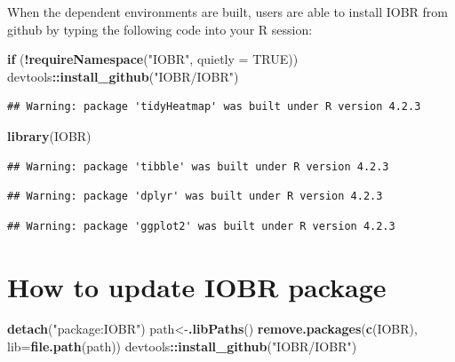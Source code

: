 \documentclass[
  12pt,
]{book}
\newenvironment{Shaded}{\begin{snugshade}}{\end{snugshade}}
\newcommand{\AttributeTok}[1]{\textcolor[rgb]{0.13,0.29,0.53}{#1}}
\newcommand{\ConstantTok}[1]{\textcolor[rgb]{0.56,0.35,0.01}{#1}}
\newcommand{\ControlFlowTok}[1]{\textcolor[rgb]{0.13,0.29,0.53}{\textbf{#1}}}
\newcommand{\FunctionTok}[1]{\textcolor[rgb]{0.13,0.29,0.53}{\textbf{#1}}}
\newcommand{\NormalTok}[1]{#1}
\newcommand{\OtherTok}[1]{\textcolor[rgb]{0.56,0.35,0.01}{#1}}
\newcommand{\SpecialCharTok}[1]{\textcolor[rgb]{0.81,0.36,0.00}{\textbf{#1}}}
\newcommand{\StringTok}[1]{\textcolor[rgb]{0.31,0.60,0.02}{#1}}
\begin{document}
When the dependent environments are built, users are able to install IOBR from github by typing the following code into your R session:

\begin{Shaded}
\begin{Highlighting}[]
\ControlFlowTok{if}\NormalTok{ (}\SpecialCharTok{!}\FunctionTok{requireNamespace}\NormalTok{(}\StringTok{"IOBR"}\NormalTok{, }\AttributeTok{quietly =} \ConstantTok{TRUE}\NormalTok{))  devtools}\SpecialCharTok{::}\FunctionTok{install\_github}\NormalTok{(}\StringTok{"IOBR/IOBR"}\NormalTok{)}
\end{Highlighting}
\end{Shaded}

\begin{verbatim}
## Warning: package 'tidyHeatmap' was built under R version 4.2.3
\end{verbatim}

\begin{Shaded}
\begin{Highlighting}[]
\FunctionTok{library}\NormalTok{(IOBR)}
\end{Highlighting}
\end{Shaded}

\begin{verbatim}
## Warning: package 'tibble' was built under R version 4.2.3
\end{verbatim}

\begin{verbatim}
## Warning: package 'dplyr' was built under R version 4.2.3
\end{verbatim}

\begin{verbatim}
## Warning: package 'ggplot2' was built under R version 4.2.3
\end{verbatim}

\hypertarget{how-to-update-iobr-package}{%
\section{How to update IOBR package}\label{how-to-update-iobr-package}}

\begin{Shaded}
\begin{Highlighting}[]
\FunctionTok{detach}\NormalTok{(}\StringTok{"package:IOBR"}\NormalTok{)}
\NormalTok{path}\OtherTok{\textless{}{-}}\FunctionTok{.libPaths}\NormalTok{()}
\FunctionTok{remove.packages}\NormalTok{(}\FunctionTok{c}\NormalTok{(}\StringTok{\textquotesingle{}IOBR\textquotesingle{}}\NormalTok{), }\AttributeTok{lib=}\FunctionTok{file.path}\NormalTok{(path))}
\NormalTok{devtools}\SpecialCharTok{::}\FunctionTok{install\_github}\NormalTok{(}\StringTok{"IOBR/IOBR"}\NormalTok{)}
\end{Highlighting}
\end{Shaded}
\end{document}
